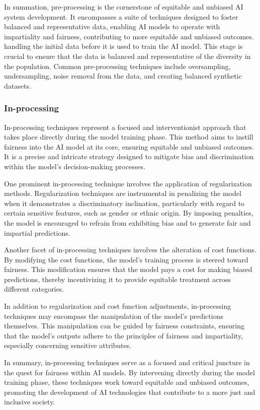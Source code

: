 \documentclass[12pt,a4paper,openright,twoside]{book}
\begin{document}
In summation, pre-processing is the cornerstone of equitable and unbiased AI system development. It encompasses a suite of techniques designed to foster balanced and representative data, enabling AI models to operate with impartiality and fairness, contributing to more equitable and unbiased outcomes. handling the initial data before it is used to train the AI model. This stage is crucial to ensure that the data is balanced and representative of the diversity in the population. Common pre-processing techniques include oversampling, undersampling, noise removal from the data, and creating balanced synthetic datasets.

\subsubsection{In-processing}
In-processing techniques represent a focused and interventionist approach that takes place directly during the model training phase. This method aims to instill fairness into the AI model at its core, ensuring equitable and unbiased outcomes. It is a precise and intricate strategy designed to mitigate bias and discrimination within the model's decision-making processes. 

One prominent in-processing technique involves the application of regularization methods. Regularization techniques are instrumental in penalizing the model when it demonstrates a discriminatory inclination, particularly with regard to certain sensitive features, such as gender or ethnic origin. By imposing penalties, the model is encouraged to refrain from exhibiting bias and to generate fair and impartial predictions. 

Another facet of in-processing techniques involves the alteration of cost functions. By modifying the cost functions, the model's training process is steered toward fairness. This modification ensures that the model pays a cost for making biased predictions, thereby incentivizing it to provide equitable treatment across different categories. 

In addition to regularization and cost function adjustments, in-processing techniques may encompass the manipulation of the model's predictions themselves. This manipulation can be guided by fairness constraints, ensuring that the model's outputs adhere to the principles of fairness and impartiality, especially concerning sensitive attributes. 

In summary, in-processing techniques serve as a focused and critical juncture in the quest for fairness within AI models. By intervening directly during the model training phase, these techniques work toward equitable and unbiased outcomes, promoting the development of AI technologies that contribute to a more just and inclusive society.
\end{document}
